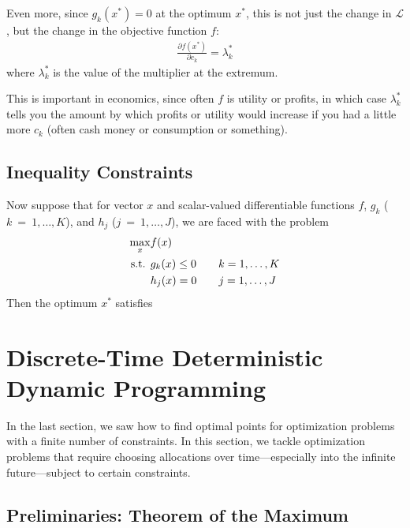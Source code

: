 \documentclass[12pt]{article}
\numberwithin{equation}{section} %
\theoremstyle{plain}
\theoremstyle{definition}
\theoremstyle{remark}
\begin{document}
Even more, since $g_k(x^*)=0$ at the optimum $x^*$, this is not just the
change in $\mathscr{L}$, but the change in the objective function $f$:
\begin{align*}
  \frac{\partial f(x^*)}{\partial c_k} = \lambda^*_k
\end{align*}
where $\lambda^*_k$ is the value of the multiplier at the extremum.

This is important in economics, since often $f$ is utility or profits,
in which case $\lambda^*_k$ tells you the amount by which profits or
utility would increase if you had a little more $c_k$ (often cash money
or consumption or something).

\subsection{Inequality Constraints}

Now suppose that for vector $x$ and scalar-valued differentiable
functions $f$, $g_k$ ($k~=~1,\ldots,K$), and $h_j$ ($j~=~1,\ldots,J$),
we are faced with the problem
\begin{align}
  \max_x &f(x) \label{prob:ineqconst}\\
  \text{s.t. } &g_k(x) \leq 0 \qquad k=1,\ldots,K\notag\\
               &h_j(x) =0 \qquad j=1,\ldots,J\notag
\end{align}
Then the optimum $x^*$ satisfies

\clearpage
\section{Discrete-Time Deterministic Dynamic Programming}
\label{sec:discrete-dynamic}

In the last section, we saw how to find optimal points for optimization
problems with a finite number of constraints. In this section, we tackle
optimization problems that require choosing allocations over
time---especially into the infinite future---subject to certain
constraints.

\clearpage
\subsection{Preliminaries: Theorem of the Maximum}
\end{document}
